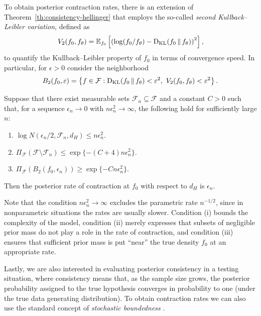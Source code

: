 To obtain posterior contraction rates, there is an extension of Theorem~\ref{th:consistency-hellinger} that employs the so-called \textit{second Kullback--Leibler variation}, defined as 
\[
  V_2(f_0, f_\theta)=\mathbb{E}_{f_0}\left[\left(\log(f_0/f_\theta) - \operatorname{D_{KL}}(f_0 \,\|\, f_\theta)\right)^2\right],
\]
to quantify the Kullback--Leibler property of \(f_0\) in terms of convergence speed. In particular, for \(\epsilon>0\) consider the neighborhood
\[
B_2(f_0, \varepsilon) = \left\{f\in \mathcal F: \operatorname{D_{KL}}(f_0 \,\|\, f_\theta) < \varepsilon^2,\  V_2(f_0, f_\theta) < \varepsilon^2\right\}.
\]

\begin{theorem}\label{th:contraction-rate}
  Suppose that there exist measurable sets \(\mathcal{F}_n \subseteq \mathcal F\) and a constant \(C>0\) such that, for a sequence \(\epsilon_n \to 0\) with \(n\epsilon_n^2 \to \infty\), the following hold for sufficiently large \(n\):
  \begin{enumerate}[label=(\roman*)]
    \item \( \log N(\epsilon_n/2, \mathcal{F}_n, d_H) \leq n \epsilon_n^2\).
    \item \( \Pi_{\mathcal F}(\mathcal{F} \setminus \mathcal{F}_n) \leq \exp\{-(C+4)n \epsilon_n^2\}\).
    \item \( \Pi_{\mathcal F}(B_2(f_0, \epsilon_n)) \geq \exp\{-C n\epsilon_n^2\}\).
  \end{enumerate}
  Then the posterior rate of contraction at \(f_0 \) with respect to \(d_H\) is \(\epsilon_n \).
\end{theorem}

Note that the condition \(n\epsilon_n^2\to\infty\) excludes the parametric rate \(n^{-1/2}\), since in nonparametric situations the rates are usually slower. Condition (i) bounds the complexity of the model, condition (ii) merely expresses that subsets of negligible prior mass do not play a role in the rate of contraction, and condition (iii) ensures that sufficient prior mass is put ``near'' the true density \(f_0\) at an appropriate rate.

Lastly, we are also interested in evaluating posterior consistency in a testing situation, where consistency means that, as the sample size grows, the posterior probability assigned to the true hypothesis converges in probability to one (under the true data generating distribution). To obtain contraction rates we can also use the standard concept of \textit{stochastic boundedness} \citep[e.g.][Chapter 2]{vaart1998asymptotic}.

